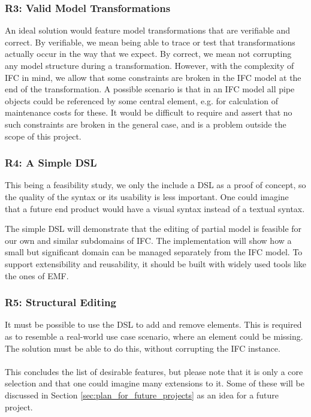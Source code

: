 \subsubsection{R3: Valid Model Transformations}
An ideal solution would feature model transformations that are verifiable and correct. By verifiable, we mean being able to trace or test that transformations actually occur in the way that we expect. By correct, we mean not corrupting any model structure during a transformation. However, with the complexity of IFC in mind, we allow that some constraints are broken in the IFC model at the end of the transformation. A possible scenario is that in an IFC model all pipe objects could be referenced by some central element, e.g. for calculation of maintenance costs for these. It would be difficult to require and assert that no such constraints are broken in the general case, and is a problem outside the scope of this project.

\subsubsection{R4: A Simple DSL}
This being a feasibility study, we only the include a DSL as a proof of concept, so the quality of the syntax or its usability is less important. One could imagine that a future end product would have a visual syntax instead of a textual syntax.

The simple DSL will demonstrate that the editing of partial model is feasible for our own and similar subdomains of IFC. The implementation will show how a small but significant domain can be managed separately from the IFC model. To support extensibility and reusability, it should be built with widely used tools like the ones of EMF.

\subsubsection{R5: Structural Editing}
It must be possible to use the DSL to add and remove elements. This is required as to resemble a real-world use case scenario, where an element could be missing. The solution must be able to do this, without corrupting the IFC instance.
\paragraph{}
This concludes the list of desirable features, but please note that it is only a core selection and that one could imagine many extensions to it. Some of these will be discussed in Section \ref{sec:plan_for_future_projects} as an idea for a future project.

